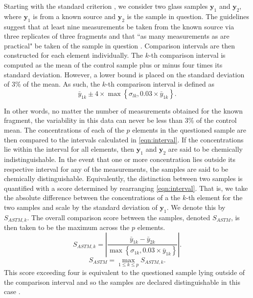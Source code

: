 \documentclass[a4paper]{article}
\newcommand{\bs}[1]{\boldsymbol{#1}}
\begin{document}
Starting with the standard criterion \citep{Koons2002,ASTM12,ASTM16}, we consider two glass samples $\bs{y}_{1}$ and $\bs{y}_{2}$, where $\bs{y}_{1}$ is from a known source and $\bs{y}_{2}$ is the sample in question. The guidelines suggest that at least nine measurements be taken from the known source via three replicates of three fragments and that ``as many measurements as are practical" be taken of the sample in question \citep{ASTM16}. Comparison intervals are then constructed for each element individually. The $k$-th comparison interval is computed as the mean of the control sample plus or minus four times its standard deviation. However, a lower bound is placed on the standard deviation of 3\% of the mean. As such, the $k$-th comparison interval is defined as 
\begin{equation}
\label{eqn:interval}
\bar{y}_{1k} \pm 4 \times \max\left\{ \sigma_{lk}, 0.03 \times  \bar{y}_{1k}\right\}.
\end{equation}

In other words, no matter the number of measurements obtained for the known fragment, the variability in this data can never be less than 3\% of the control mean. The concentrations of each of the $p$ elements in the questioned sample are then compared to the intervals calculated in \autoref{eqn:interval}. If the concentrations lie within the interval for all elements, then $\bs{y}_{1}$ and $\bs{y}_{2}$ are said to be chemically indistinguishable. In the event that one or more concentration lies outside its respective interval for any of the measurements, the samples are said to be chemically distinguishable. Equivalently, the distinction between two samples is quantified with a score determined by rearranging \cref{eqn:interval}. That is, we take the absolute difference between the concentrations of a the $k$-th element for the two samples and scale by the standard deviation of $\bs{y}_{1}$. We denote this by $S_{ASTM,k}$. The overall comparison score between the samples, denoted $S_{ASTM}$, is then taken to be the maximum across the $p$ elements.
\begin{equation}
\label{eqn:score}
S_{ASTM,k} = \left| \frac{\bar{y}_{1k} - \bar{y}_{2k}}{\max\left\{ \sigma_{1k}, 0.03 \times  \bar{y}_{1k}\right\}} \right|.
\end{equation}
\begin{equation*}
    S_{ASTM} = \max_{1 \leq k \leq p} S_{ASTM,k}.
\end{equation*}
This score exceeding four is equivalent to the questioned sample lying outside of the comparison interval and so the samples are declared distinguishable in this case \citep{ASTM12,ASTM16}.
\end{document}
